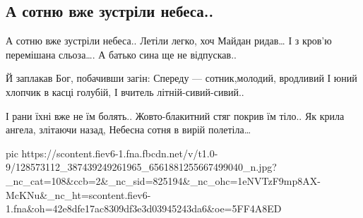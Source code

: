  
 
 
 
 

\subsection{А сотню вже зустріли небеса..}
\label{sec:01_12_2020.fb.patrioty_ukrainy.2.nebesna_sotja}


\begin{multicols}{2}
	\obeycr
А сотню вже зустріли небеса..
Летіли легко, хоч Майдан ридав…
І з кров'ю перемішана сльоза….
А батько сина ще не відпускав..

Й заплакав Бог, побачивши загін:
Спереду — сотник,молодий, вродливий
І юний хлопчик в касці голубій,
І вчитель літній-сивий-сивий..

І рани їхні вже не їм болять..
Жовто-блакитний стяг покрив їм тіло..
Як крила ангела, злітаючи назад,
Небесна сотня в вирій полетіла…
	\restorecr
\end{multicols}

\ifcmt
pic https://scontent.fiev6-1.fna.fbcdn.net/v/t1.0-9/128573112_387439249261965_6561881255667499040_n.jpg?_nc_cat=108&ccb=2&_nc_sid=825194&_nc_ohc=1eNVTzF9mp8AX-McKNu&_nc_ht=scontent.fiev6-1.fna&oh=42e8dfe17ac8309df3e3d03945243da6&oe=5FF4A8ED
\fi
